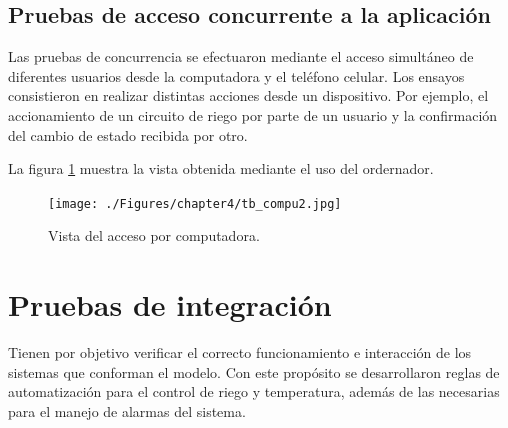 \subsection{Pruebas de acceso concurrente a la aplicación}
\label{sec:Pruebas de acceso concurrente a la aplicación}



Las pruebas de concurrencia se efectuaron mediante el acceso simultáneo de diferentes usuarios desde la computadora y el teléfono celular. Los ensayos consistieron en realizar distintas acciones desde un dispositivo. Por ejemplo, el accionamiento de un circuito de riego por parte de un usuario y la confirmación del cambio de estado recibida por otro. 
 
La figura \ref{fig:tb_compu} muestra la vista obtenida mediante el uso del ordernador.

\begin{figure}[!h]
	\centering
		 \texttt{[image: ./Figures/chapter4/tb\_compu2.jpg]}
		\caption{Vista del acceso por computadora.}
		\label{fig:tb_compu}
\end{figure}



\section{Pruebas de integración}
\label{sec:Pruebas de sistema}

Tienen por objetivo verificar el correcto funcionamiento e interacción de los sistemas que conforman el modelo. Con este propósito se desarrollaron reglas de automatización para el control de riego y temperatura, además de las necesarias para el manejo de alarmas del sistema. 

